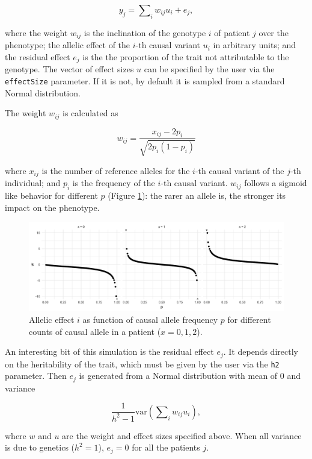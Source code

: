 \documentclass[
  11pt,
]{env/yjiao}
\begin{document}
\[ y_j = \sum\nolimits_i w_{ij} u_i + e_j ,\]

where the weight \(w_{ij}\) is the inclination of the genotype \(i\) of patient \(j\) over the phenotype; the allelic effect of the \(i\)-th causal variant \(u_i\) in arbitrary units; and the residual effect \(e_j\) is the the proportion of the trait not attributable to the genotype. The vector of effect sizes \(u\) can be specified by the user via the \texttt{effectSize} parameter. If it is not, by default it is sampled from a standard Normal distribution.

The weight \(w_{ij}\) is calculated as

\[ w_{ij} = \frac{x_{ij} - 2p_i}{\sqrt{2p_i(1 - p_i)}} \]

where \(x_{ij}\) is the number of reference alleles for the \(i\)-th causal variant of the \(j\)-th individual; and \(p_i\) is the frequency of the \(i\)-th causal variant. \(w_{ij}\) follows a sigmoid like behavior for different \(p\) (Figure \ref{fig:p-vs-w}): the rarer an allele is, the stronger its impact on the phenotype.



\begin{figure}
\centering
\includegraphics{fig/2_p_vs_w.png}
\caption{\label{fig:p-vs-w}Allelic effect \(i\) as function of causal allele frequency \(p\) for different counts of causal allele in a patient (\(x = 0, 1, 2\)).}
\end{figure}

An interesting bit of this simulation is the residual effect \(e_j\). It depends directly on the heritability of the trait, which must be given by the user via the \texttt{h2} parameter. Then \(e_j\) is generated from a Normal distribution with mean of 0 and variance

\[ \frac{1}{h^2 - 1} \text{var} \left(\sum\nolimits_i w_{ij} u_i\right),\]

where \(w\) and \(u\) are the weight and effect sizes specified above. When all variance is due to genetics (\(h^2 = 1\)), \(e_j = 0\) for all the patients \(j\).
\end{document}
